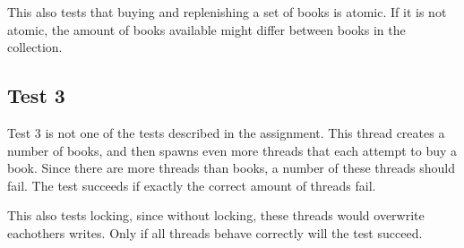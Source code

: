 This also tests that buying and replenishing a set of books is atomic. If it is not atomic, the amount of books available might differ between books in the collection.

\subsection{Test 3}
Test 3 is not one of the tests described in the assignment. This thread creates a number of books, and then spawns even more threads that each attempt to buy a book. Since there are more threads than books, a number of these threads should fail. The test succeeds if exactly the correct amount of threads fail.

This also tests locking, since without locking, these threads would overwrite eachothers writes. Only if all threads behave correctly will the test succeed.
